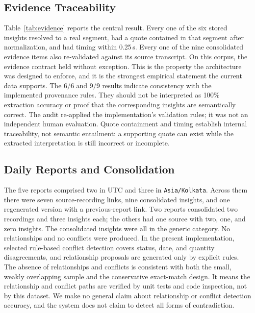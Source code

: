 \documentclass[10pt,a4paper]{article}
\newcommand{\code}[1]{\texttt{#1}}
\begin{document}
\subsection{Evidence Traceability}

Table~\ref{tab:evidence} reports the central result. Every one of the six stored insights
resolved to a real segment, had a quote contained in that segment after normalization, and
had timing within 0.25\,s. Every one of the nine consolidated evidence items also
re-validated against its source transcript. On this corpus, the evidence contract held
without exception. This is the property the architecture was designed to enforce, and it is
the strongest empirical statement the current data supports. The 6/6 and 9/9 results
indicate consistency with the implemented provenance rules. They should not be interpreted
as 100\% extraction accuracy or proof that the corresponding insights are semantically
correct. The audit re-applied the implementation's validation rules; it was not an
independent human evaluation. Quote containment and timing establish internal traceability,
not semantic entailment: a supporting quote can exist while the extracted interpretation is
still incorrect or incomplete.

\subsection{Daily Reports and Consolidation}

The five reports comprised two in UTC and three in \code{Asia/Kolkata}. Across them there
were seven source-recording links, nine consolidated insights, and one regenerated version
with a previous-report link. Two reports consolidated two recordings and three insights
each; the others had one source with two, one, and zero insights. The consolidated insights
were all in the generic category. No relationships and no conflicts were produced. In the
present implementation, selected rule-based conflict detection covers status, date, and
quantity disagreements, and relationship proposals are generated only by explicit rules.
The absence of relationships and conflicts is consistent with both the small, weakly
overlapping sample and the conservative exact-match design. It means the relationship and
conflict paths are verified by unit tests and code inspection, not by this dataset. We make
no general claim about relationship or conflict detection accuracy, and the system does not
claim to detect all forms of contradiction.
\end{document}
